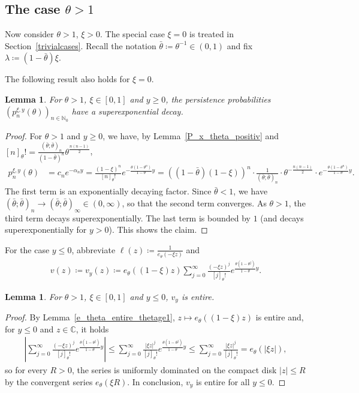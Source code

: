 \documentclass[10pt,a4paper]{amsart}
\newcommand{\N}{\mathbb{N}} %
\newcommand{\C}{\mathbb{C}} %
\newcommand{\1}{\mathds{1}}
\newtheorem{Lemma}[definition]{Lemma}
\begin{document}
\subsection{The case \texorpdfstring{$\theta>1$}{theta>1}}\label{sec_thetage1}
Now consider $\theta >1$, $\xi>0$. The special case $\xi=0$ is treated in Section~\ref{trivialcases}. Recall the notation $\bar\theta\coloneqq\theta^{-1}\in(0,1)$ and fix $\lambda\coloneqq (1-\bar\theta)\xi$. 

The following result also holds for $\xi=0$.
\begin{Lemma}\label{asymptotic_pos_theta_ge1_pos_y}
  For $\theta >1$, $\xi\in[0,1]$ and $y\ge0$, the persistence probabilities $\left(p_n^{\xi,y}(\theta)\right)_{n\in\N_0}$ have a superexponential decay.
 \end{Lemma}
\begin{proof}
For $\theta>1$ and $y\ge 0$, we have, by Lemma~\ref{P_x_theta_positiv} and $[n]_\theta!=\frac{(\bar\theta;\bar\theta)_n}{(1-\bar\theta)^n}\theta^{\frac{n(n-1)}{2}}$,
    \begin{align*}
        p_n^{\xi,y}(\theta)
        &=c_ne^{-\alpha_ny}
        =\frac{(1-\xi)^n}{[n]_\theta!}e^{-\frac{\theta(1-\theta^n)}{1-\theta}y}
       =((1-\bar\theta)(1-\xi))^n\cdot \frac{1}{(\bar\theta;\bar\theta)_n}\cdot \theta^{-\frac{n(n-1)}{2}}\cdot e^{-\frac{\theta(1-\theta^n)}{1-\theta}y}.
    \end{align*}
The first term is an exponentially decaying factor. Since $\bar\theta<1$, we have $(\bar\theta;\bar\theta)_n\to (\bar\theta;\bar\theta)_\infty\in(0,\infty)$, so that the second term converges. As $\theta>1$, the third term decays superexponentially. The last term is bounded by $1$ (and decays superexponentially for $y>0$). This shows the claim.
\end{proof}
For the case $y\le 0$, abbreviate $\ell(z)\coloneqq\frac{1}{e_\theta(-\xi z)}$ and
\begin{align*}
  v(z)\coloneqq  v_y(z)\coloneqq  e_\theta((1-\xi)z)\sum_{j=0}^\infty \frac{(-\xi z)^{j}}{[j]_\theta!}e^{\frac{\theta(1-\theta^j)}{1-\theta}y}.
\end{align*}
\begin{Lemma}\label{v_entire_thetage1}
   For $\theta>1$, $\xi\in[0,1]$ and $y\le0$,  $v_y$ is entire.
\end{Lemma}
\begin{proof}
    By Lemma~\ref{e_theta_entire_thetage1}, $z\mapsto e_\theta((1-\xi)z)$ is entire and, for $y\le 0$ and $z\in\C$, it holds
\begin{align*}
    \left|\sum_{j=0}^\infty \frac{(-\xi z)^{j}}{[j]_\theta!}e^{\frac{\theta(1-\theta^j)}{1-\theta}y}\right|
    \le\sum_{j=0}^\infty \frac{|\xi z|^{j}}{[j]_\theta!}e^{\frac{\theta(1-\theta^j)}{1-\theta}y}
     \le\sum_{j=0}^\infty \frac{|\xi z|^{j}}{[j]_\theta!}
     =e_\theta(|\xi z|),
\end{align*}
so for every $R>0$, the series is uniformly dominated on the compact disk $|z|\le R$ by the convergent series $e_\theta(\xi R)$. In conclusion, $v_y$ is entire for all $y\le 0$.
\end{proof}
\end{document}
